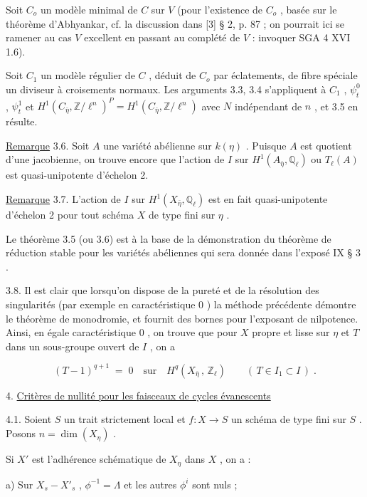 Soit  $C_o$  un modèle minimal de  $C$  sur  $V$  (pour l'existence de  $C_o$ , basée sur le théorème d'Abhyankar, cf. la discussion dans  [3] § 2, p. 87 ; on pourrait ici se ramener au cas  $V$  excellent en passant au complété de  $V$ : invoquer SGA 4 XVI 1.6).

Soit  $C_1$  un modèle régulier de  $C$ , déduit de  $C_o$  par éclatements, de fibre spéciale un diviseur à croisements  normaux. Les arguments 3.3, 3.4 s'appliquent à  $C_1$ , $\psi_t^0$ , $\psi_t^1$  et  $H^1(C_{\bar\eta},\mathbb{Z}/\ell^n)^P = H^1(C_{\bar\eta},\mathbb{Z}/\ell^n)$  avec  $N$  indépendant de  $n$ , et 3.5 en résulte.

\underline{Remarque} 3.6.    Soit  $A$  une variété abélienne sur  $k(\eta)$ . Puisque  $A$  est quotient d'une jacobienne, on trouve encore que l'action de  $I$  sur  $H^1(A_{\bar\eta},\mathbb{Q}_\ell)$  ou  $T_\ell(A)$  est quasi-unipotente d'échelon 2.

\underline{Remarque} 3.7.   L'action de  $I$  sur  $H^1(X_{\bar\eta},\mathbb{Q}_\ell)$  est en fait quasi-unipotente d'échelon 2 pour tout schéma  $X$  de type fini sur  $\eta$ .

Le théorème 3.5 (ou 3.6) est à la base de la démonstration du théorème de réduction stable pour les variétés abéliennes qui sera donnée dans l'exposé IX § 3 .

3.8.   Il est clair que lorsqu'on dispose de la pureté et de la résolution des singularités (par exemple en caractéristique 0 ) la méthode précédente démontre le théorème de monodromie, et fournit des bornes pour l'exposant de nilpotence. Ainsi, en égale caractéristique 0 , on trouve que pour  $X$  propre et lisse sur  $\eta$  et  $T$  dans un sous-groupe ouvert de  $I$ , on a

\begin{equation*}
(T - 1)^{q+1} \;=\; 0 \quad \text{sur} \quad H^q(X_{\bar\eta}\,,\, \mathbb{Z}_\ell) \qquad ( \, T \in I_1 \subset I \, ) \; .
\end{equation*}

4. \underline{Critères de nullité pour les faisceaux de cycles évanescents}

4.1.  Soient  $S$  un trait strictement local et  $f : X \longrightarrow S$  un schéma de type fini sur  $S$ . Posons  $n = \dim(X_\eta)$ .

Si  $X'$  est l'adhérence schématique de  $X_\eta$ dans  $X$ , on a :

a) Sur  $X_s - X'_s$ ,  $\phi^{-1} = \Lambda$  et les autres  $\phi^i$  sont nuls ;


